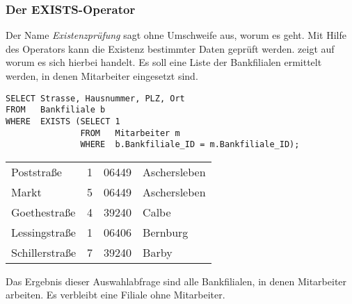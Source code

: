 				\subsubsection{Der EXISTS-Operator}
          Der Name \textit{Existenzprüfung} sagt ohne Umschweife aus, worum es geht. Mit Hilfe des Operators  kann die Existenz bestimmter Daten geprüft werden.  zeigt auf worum es sich hierbei handelt. Es soll eine Liste der Bankfilialen ermittelt werden, in denen Mitarbeiter eingesetzt sind.
          \begin{lstlisting}[language=oracle_sql,caption={Der \languageorasql{EXISTS}-Operator},label=sql06_08]
SELECT Strasse, Hausnummer, PLZ, Ort
FROM   Bankfiliale b
WHERE  EXISTS (SELECT 1
               FROM   Mitarbeiter m
               WHERE  b.Bankfiliale_ID = m.Bankfiliale_ID);
          \end{lstlisting}
\begin{center}
    \begin{small}
        \tablehead{}
        \tabletail {
        }
        \begin{msoraclesql}
            \begin{supertabular}{llll}
                Poststraße & 1 & 06449 & Aschersleben \\
                Markt & 5 & 06449 & Aschersleben \\
                Goethestraße & 4 & 39240 & Calbe \\
                Lessingstraße & 1 & 06406 & Bernburg \\
                Schillerstraße & 7 & 39240 & Barby \\
            \end{supertabular}
        \end{msoraclesql}
    \end{small}
\end{center}
Das Ergebnis dieser Auswahlabfrage sind alle Bankfilialen, in denen Mitarbeiter arbeiten. Es verbleibt eine Filiale ohne Mitarbeiter.

